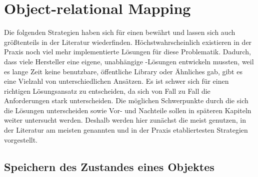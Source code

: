 \chapter{Object-relational Mapping}

Die folgenden Strategien haben sich für einen \ORM bewährt und lassen sich auch größtenteils in der Literatur wiederfinden. Höchstwahrscheinlich existieren in der Praxis noch viel mehr implementierte Lösungen für diese Problematik. Dadurch, dass viele Hersteller eine eigene, unabhängige \ORM-Lösungen entwickeln mussten, weil es lange Zeit keine benutzbare, öffentliche Library oder Ähnliches gab, gibt es eine Vielzahl von unterschiedlichen Ansätzen. Es ist schwer sich für einen richtigen Lösungsansatz zu entscheiden, da sich von Fall zu Fall die Anforderungen stark unterscheiden. Die möglichen Schwerpunkte durch die sich die Lösungen unterscheiden sowie Vor- und Nachteile sollen in späteren Kapiteln weiter untersucht werden. Deshalb werden hier zunächst die meist genutzen, in der Literatur am meisten genannten und in der Praxis etabliertesten Strategien vorgestellt.

\section{Speichern des Zustandes eines Objektes}

